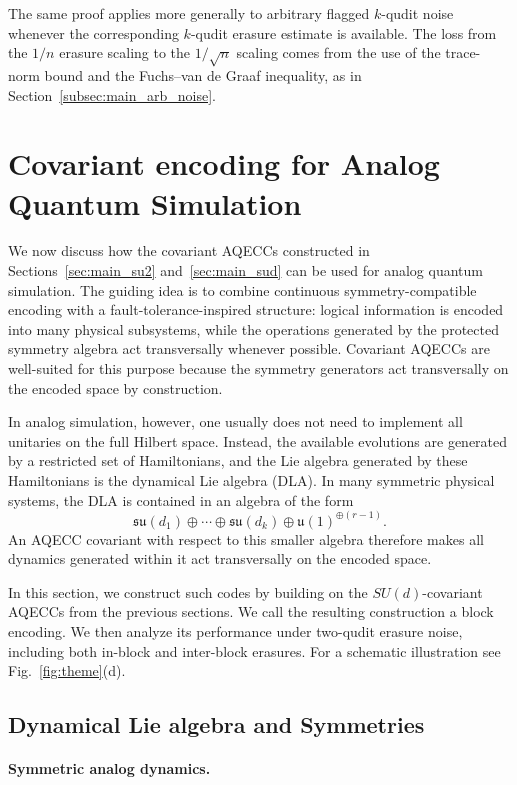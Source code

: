 \documentclass[10pt,twocolumn,superscriptaddress,aps,amsmath,amssymb,citeautoscript,floatfix,prx,longbibliography]{revtex4-2}
\newcounter{alg}
\theoremstyle{plain}
\theoremstyle{plain}
\theoremstyle{plain}
\theoremstyle{plain}
\theoremstyle{plain}
\theoremstyle{plain}
\begin{document}
The same proof applies more generally to arbitrary flagged $k$-qudit noise whenever the corresponding $k$-qudit erasure estimate is available. The loss from the $1/n$ erasure scaling to the $1/\sqrt n$ scaling comes from the use of the trace-norm bound and the Fuchs--van de Graaf inequality, as in Section~\ref{subsec:main_arb_noise}.


\section{Covariant encoding for Analog Quantum Simulation}\label{sec:main_covar_analog}

We now discuss how the covariant AQECCs constructed in Sections~\ref{sec:main_su2} and~\ref{sec:main_sud} can be used for analog quantum simulation. The guiding idea is to combine continuous symmetry-compatible encoding with a fault-tolerance-inspired structure: logical information is encoded into many physical subsystems, while the operations generated by the protected symmetry algebra act transversally whenever possible. Covariant AQECCs are well-suited for this purpose because the symmetry generators act transversally on the encoded space by construction.

In analog simulation, however, one usually does not need to implement all unitaries on the full Hilbert space. Instead, the available evolutions are generated by a restricted set of Hamiltonians, and the Lie algebra generated by these Hamiltonians is the dynamical Lie algebra (DLA). In many symmetric physical systems, the DLA is contained in an algebra of the form
$$
\mathfrak{su}(d_1)
\oplus
\cdots
\oplus
\mathfrak{su}(d_k)
\oplus
\mathfrak{u}(1)^{\oplus(r-1)} .
$$
An AQECC covariant with respect to this smaller algebra therefore makes all dynamics generated within it act transversally on the encoded space.

In this section, we construct such codes by building on the $SU(d)$-covariant AQECCs from the previous sections. We call the resulting construction a block encoding. We then analyze its performance under two-qudit erasure noise, including both in-block and inter-block erasures. For a schematic illustration see Fig.~\ref{fig:theme}(d).

\subsection{Dynamical Lie algebra and Symmetries}\label{subsec:main_DLA}

\paragraph{Symmetric analog dynamics.}
\end{document}
